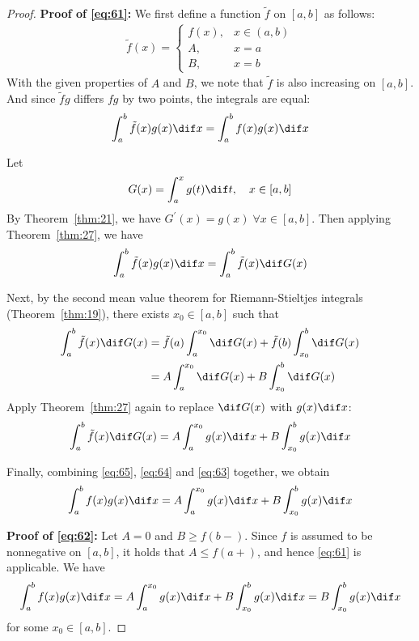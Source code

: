 \documentclass[thmcnt=section, color=blue, 12pt]{my-elegantbook}
\begin{document}
\begin{proof}
	\noindent\textbf{Proof of \eqref{eq:61}:}
	We first define a function $\tilde{f}$ on $[a, b]$ as follows:
	\begin{align*}
		\tilde{f}(x) = \begin{cases}
			               f(x), & x \in (a, b) \\
			               A,    & x=a          \\
			               B,    & x=b
		               \end{cases}
	\end{align*}
	With the given properties of $A$ and $B$, we note
	that $\tilde{f}$ is also increasing on $[a, b]$.
	And since $\tilde{f} g$ differs $f g$ by two points,
	the integrals are equal:
	\begin{align}
		\int_a^b \tilde{f}(x) g(x) \dif x
		= \int_a^b f(x) g(x) \dif x
		\label{eq:65}
	\end{align}

	Let
	\begin{align*}
		G(x) = \int_a^x g(t) \dif t, \quad x \in [a, b]
	\end{align*}
	By Theorem~\ref{thm:21}, we have $G^\prime(x) = g(x) \; \forall x \in [a, b]$.
	Then applying Theorem~\ref{thm:27}, we have
	\begin{align}
		\int_a^b \tilde{f}(x) g(x) \dif x
		= \int_a^b \tilde{f}(x) \dif G(x)
		\label{eq:64}
	\end{align}

	Next, by the second mean value theorem for Riemann-Stieltjes integrals
	(Theorem~\ref{thm:19}), there exists $x_0 \in [a, b]$ such that
	\begin{align*}
		\int_a^b \tilde{f}(x) \dif G(x)
		 & = \tilde{f}(a) \int_a^{x_0} \dif G(x)
		+ \tilde{f}(b) \int_{x_0}^b \dif G(x)    \\
		 & =  A \int_a^{x_0} \dif G(x)
		+ B \int_{x_0}^b \dif G(x)
	\end{align*}
	Apply Theorem~\ref{thm:27} again to replace $\dif G(x)$ with $g(x) \dif x$:
	\begin{align}
		\int_a^b \tilde{f}(x) \dif G(x)
		=  A \int_a^{x_0} g(x) \dif x
		+ B \int_{x_0}^b g(x) \dif x
		\label{eq:63}
	\end{align}

	Finally, combining \eqref{eq:65}, \eqref{eq:64} and \eqref{eq:63} together,
	we obtain
	\begin{align*}
		\int_a^b f(x) g(x) \dif x
		=  A \int_a^{x_0} g(x) \dif x
		+ B \int_{x_0}^b g(x) \dif x
	\end{align*}



	\noindent\textbf{Proof of \eqref{eq:62}:}
	Let $A = 0$ and $B \geq f(b-)$.
	Since $f$ is assumed to be nonnegative on $[a, b]$,
	it holds that $A \leq f(a+)$, and hence \eqref{eq:61} is applicable.
	We have
	\begin{align*}
		\int_a^b f(x) g(x) \dif x
		=  A \int_a^{x_0} g(x) \dif x
		+ B \int_{x_0}^b g(x) \dif x
		=  B \int_{x_0}^b g(x) \dif x
	\end{align*}
	for some $x_0 \in [a, b]$.

\end{proof}
\end{document}
